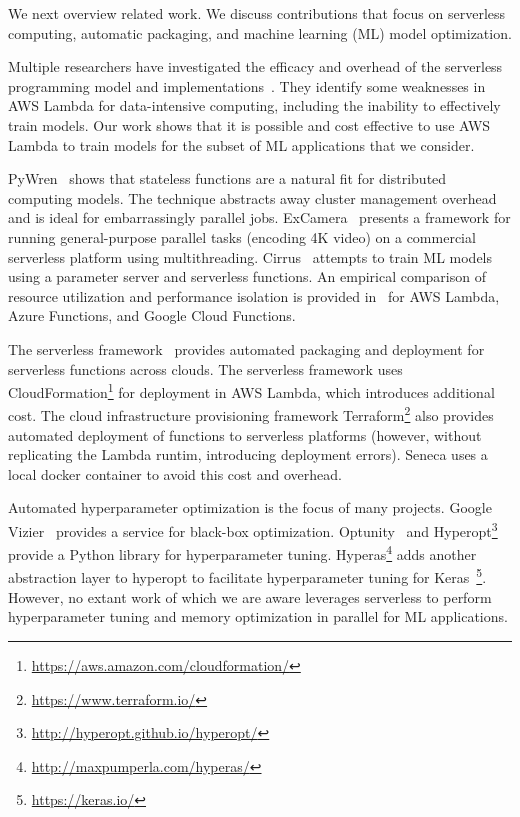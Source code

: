 We next overview related work. We discuss contributions that focus
on serverless computing, automatic packaging, 
and machine learning (ML) model optimization. 

Multiple researchers have investigated the efficacy and overhead of the
serverless programming model and 
implementations~\cite{ref:jonas2017occupy,ref:onesteptwostep,ref:baldini2017,ref:lin2018tracking}.
They identify some weaknesses in AWS
Lambda for data-intensive computing, including the inability to 
effectively train models.
Our work shows that it is possible and cost effective to use
AWS Lambda to train models for the subset of ML applications that we 
consider.

PyWren~\cite{ref:jonas2017occupy} shows that stateless functions
are a natural fit for distributed computing models. The technique
abstracts away cluster management overhead and is ideal for 
embarrassingly parallel jobs.  ExCamera~\cite{ref:encoding} presents a 
framework for running general-purpose parallel tasks (encoding 4K video) 
on a commercial serverless platform using multithreading. 
Cirrus~\cite{ref:jonas2019cloud} attempts to train ML models 
using a parameter server and serverless functions. 
An empirical comparison of resource utilization and performance isolation
is provided in~\cite{ref:peeking} for AWS Lambda, 
Azure Functions, and Google Cloud Functions.

The serverless framework~\cite{ref:serverless_framework} provides
automated packaging and deployment for serverless functions across clouds. 
The serverless framework uses CloudFormation\footnote{\url{https://aws.amazon.com/cloudformation/}} for deployment in AWS Lambda, which introduces additional cost. 
The cloud infrastructure provisioning 
framework Terraform\footnote{\url{https://www.terraform.io/}}
also provides automated deployment of functions to serverless platforms
(however, without replicating the Lambda runtim, introducing deployment errors).
Seneca uses a local docker container to avoid this cost and overhead. 

Automated hyperparameter optimization is the focus of
many projects. Google Vizier~\cite{ref:vizier} provides a service for 
black-box optimization. Optunity~\cite{ref:claesen2014hyperparameter} 
and Hyperopt\footnote{\url{http://hyperopt.github.io/hyperopt/}}
provide a Python library for hyperparameter tuning. 
Hyperas\footnote{\url{http://maxpumperla.com/hyperas/}} adds another 
abstraction layer to hyperopt to facilitate hyperparameter tuning for 
Keras~\footnote{\url{https://keras.io/}}. However, no extant work of which we are aware leverages
serverless to perform hyperparameter tuning and memory optimization in parallel 
for ML applications.
